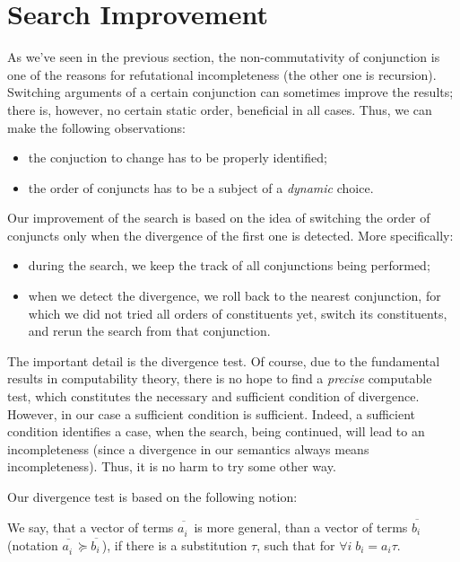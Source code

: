 \section{Search Improvement}
\label{improvement}

As we've seen in the previous section, the non-commutativity of conjunction is one of the reasons for
refutational incompleteness (the other one is recursion). Switching arguments of a certain conjunction
can sometimes improve the results; there is, however, no certain static order,
beneficial in all cases. Thus, we can make the following observations:

\begin{itemize}
\item the conjuction to change has to be properly identified;
\item the order of conjuncts has to be a subject of a \emph{dynamic} choice.
\end{itemize}

Our improvement of the search is based on the idea of switching the order of conjuncts only when
the divergence of the first one is detected. More specifically: 

\begin{itemize}
\item during the search, we keep the track of all conjunctions being performed;
\item when we detect the divergence, we roll back to the nearest conjunction, for which 
we did not tried all orders of constituents yet, switch its constituents, and rerun 
the search from that conjunction.
\end{itemize}

The important detail is the divergence test. Of course, due to the fundamental results in computability
theory, there is no hope to find a \emph{precise} computable test, which constitutes the necessary and 
sufficient condition of divergence. However, in our case a sufficient condition is sufficient. Indeed,  
a sufficient condition identifies a case, when the search, being continued, will lead to an incompleteness 
(since a divergence in our semantics always means incompleteness). Thus, it is no harm to try some other way. 

Our divergence test is based on the following notion:

\begin{definition}
\normalfont 
We say, that a vector of terms $\overline{a^{\phantom{x}}_i}$ is more general, than a vector of terms $\overline{b^{\phantom{x}}_i}$ (notation 
$\overline{a^{\phantom{x}}_i}\succeq\overline{b^{\phantom{x}}_i}$), if there is a substitution $\tau$, such that for $\forall i\;b_i = a_i \tau$.
\end{definition}

